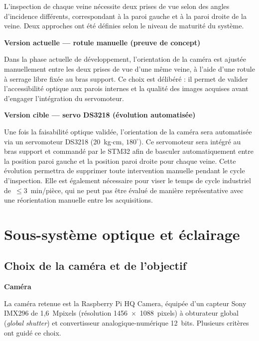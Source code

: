 L'inspection de chaque veine nécessite deux prises de vue selon des angles d'incidence
différents, correspondant à la paroi gauche et à la paroi droite de la veine. Deux approches
ont été définies selon le niveau de maturité du système.

\medskip
\noindent\textbf{Version actuelle — rotule manuelle (preuve de concept)}

Dans la phase actuelle de développement, l'orientation de la caméra est ajustée manuellement
entre les deux prises de vue d'une même veine, à l'aide d'une rotule à serrage libre fixée
au bras support. Ce choix est délibéré : il permet de valider l'accessibilité optique aux
parois internes et la qualité des images acquises avant d'engager l'intégration du servomoteur.

\medskip
\noindent\textbf{Version cible — servo DS3218 (évolution automatisée)}

Une fois la faisabilité optique validée, l'orientation de la caméra sera automatisée via un
servomoteur DS3218 (20~kg$\cdot$cm, $180^{\circ}$). Ce servomoteur sera intégré au bras support et
commandé par le STM32 afin de basculer automatiquement entre la position paroi gauche et la
position paroi droite pour chaque veine. Cette évolution permettra de supprimer toute
intervention manuelle pendant le cycle d'inspection. Elle est également nécessaire pour viser
le temps de cycle industriel de~$\leq 3$~min/pièce, qui ne peut pas être évalué de manière
représentative avec une réorientation manuelle entre les acquisitions.

\section{Sous-système optique et éclairage}
\label{sec:optique}

\subsection{Choix de la caméra et de l'objectif}

\noindent\textbf{Caméra}

La caméra retenue est la Raspberry Pi HQ Camera, équipée d'un capteur Sony IMX296 de
1,6~Mpixels (résolution 1456~$\times$~1088~pixels) à obturateur global (\textit{global
shutter}) et convertisseur analogique-numérique 12~bits. Plusieurs critères ont guidé ce
choix.


